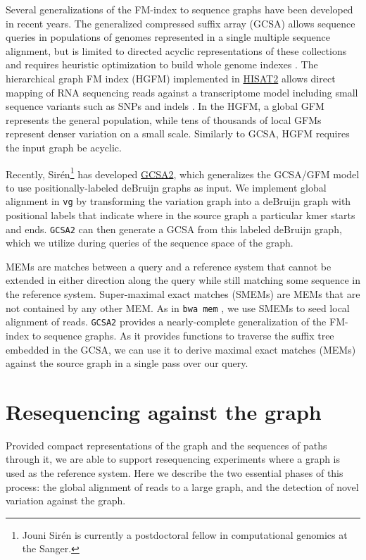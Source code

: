 \documentclass{article}
\begin{document}
Several generalizations of the FM-index to sequence graphs have been developed in recent years.
The generalized compressed suffix array (GCSA) allows sequence queries in populations of genomes represented in a single multiple sequence alignment, but is limited to directed acyclic representations of these collections and requires heuristic optimization to build whole genome indexes \cite{siren2011indexing, siren2014indexing}.
The hierarchical graph FM index (HGFM) implemented in \href{https://github.com/infphilo/hisat2}{HISAT2} allows direct mapping of RNA sequencing reads against a transcriptome model including small sequence variants such as SNPs and indels \cite{kim2015hisat}.
In the HGFM, a global GFM represents the general population, while tens of thousands of local GFMs represent denser variation on a small scale.
Similarly to GCSA, HGFM requires the input graph be acyclic.

Recently, Sirén\footnote{Jouni Sirén is currently a postdoctoral fellow in computational genomics at the Sanger.} has developed \href{https://github.com/jltsiren/gcsa2}{GCSA2}, which generalizes the GCSA/GFM model to use positionally-labeled deBruijn graphs as input.
We implement global alignment in {\tt vg} by transforming the variation graph into a deBruijn graph with positional labels that indicate where in the source graph a particular kmer starts and ends.
{\tt GCSA2} can then generate a GCSA from this labeled deBruijn graph, which we utilize during queries of the sequence space of the graph.

MEMs are matches between a query and a reference system that cannot be extended in either direction along the query while still matching some sequence in the reference system.
Super-maximal exact matches (SMEMs) are MEMs that are not contained by any other MEM.
As in {\tt bwa mem} \cite{li2013bwamem}, we use SMEMs to seed local alignment of reads.
{\tt GCSA2} provides a nearly-complete generalization of the FM-index to sequence graphs.
As it provides functions to traverse the suffix tree embedded in the GCSA, we can use it to derive maximal exact matches (MEMs) against the source graph in a single pass over our query.

\section{Resequencing against the graph}

Provided compact representations of the graph and the sequences of paths through it, we are able to support resequencing experiments where a graph is used as the reference system.
Here we describe the two essential phases of this process: the global alignment of reads to a large graph, and the detection of novel variation against the graph.
\end{document}
